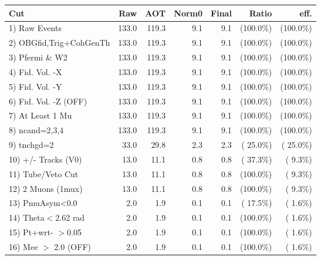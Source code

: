  \begin{table}[h!]\centering
 \begin{tabular}{||l||r|r|r|r|r|r||}
 \hline
 \hline
 Cut & Raw & AOT & Norm0 & Final & Ratio & eff.       \\
 \hline
  1) Raw Events           &        133.0 &        119.3 &          9.1 &          9.1 & (100.0\%) & (100.0\%) \\
  2) OBGfid,Trig+CohGenTh &        133.0 &        119.3 &          9.1 &          9.1 & (100.0\%) & (100.0\%) \\
  3) Pfermi \& W2         &        133.0 &        119.3 &          9.1 &          9.1 & (100.0\%) & (100.0\%) \\
  4) Fid. Vol. -X         &        133.0 &        119.3 &          9.1 &          9.1 & (100.0\%) & (100.0\%) \\
  5) Fid. Vol. -Y         &        133.0 &        119.3 &          9.1 &          9.1 & (100.0\%) & (100.0\%) \\
  6) Fid. Vol. -Z (OFF)   &        133.0 &        119.3 &          9.1 &          9.1 & (100.0\%) & (100.0\%) \\
  7) At Least 1 Mu        &        133.0 &        119.3 &          9.1 &          9.1 & (100.0\%) & (100.0\%) \\
  8) ncand=2,3,4          &        133.0 &        119.3 &          9.1 &          9.1 & (100.0\%) & (100.0\%) \\
  9) tnchgd=2             &         33.0 &         29.8 &          2.3 &          2.3 & ( 25.0\%) & ( 25.0\%) \\
 10) +/- Tracks (V0)      &         13.0 &         11.1 &          0.8 &          0.8 & ( 37.3\%) & (  9.3\%) \\
 11) Tube/Veto Cut        &         13.0 &         11.1 &          0.8 &          0.8 & (100.0\%) & (  9.3\%) \\
 12) 2 Muons (1mux)       &         13.0 &         11.1 &          0.8 &          0.8 & (100.0\%) & (  9.3\%) \\
 13) PmuAsym<0.0          &          2.0 &          1.9 &          0.1 &          0.1 & ( 17.5\%) & (  1.6\%) \\
 14) Theta$<$2.62 rad     &          2.0 &          1.9 &          0.1 &          0.1 & (100.0\%) & (  1.6\%) \\
 15) Pt+wrt- $>$0.05      &          2.0 &          1.9 &          0.1 &          0.1 & (100.0\%) & (  1.6\%) \\
 16) Mee $>$ 2.0  (OFF)   &          2.0 &          1.9 &          0.1 &          0.1 & (100.0\%) & (  1.6\%) \\

\end{tabular}
\end{table}
